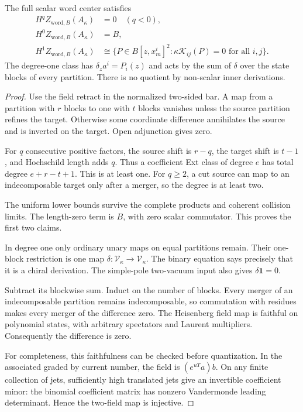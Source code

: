 \begin{theorem}\label{v4-arith:centers:thm:heis-one}
The full scalar word center satisfies
\[
\begin{split}
 H^qZ_{\mathrm{word},B}(A_\kappa)&=0\quad(q<0),\\
 H^0Z_{\mathrm{word},B}(A_\kappa)&=B,\\
 H^1Z_{\mathrm{word},B}(A_\kappa)
 &\cong
 \{P\in B[z,x^i_m]^2:
           \kappa\mathcal K_{ij}(P)=0\text{ for all }i,j\}.
\end{split}
\]
The degree-one class has
$\delta_z a^i=P_i(z)$ and acts by
the sum of $\delta$ over the state
blocks of every partition. There
is no quotient by non-scalar
inner derivations.
\end{theorem}

\begin{proof}
Use the field retract in the
normalized two-sided bar. A map
from a partition with $r$ blocks
to one with $t$ blocks vanishes
unless the source partition
refines the target. Otherwise
some coordinate difference
annihilates the source and is
inverted on the target. Open
adjunction gives zero.

For $q$ consecutive positive
factors, the source shift is
$r-q$, the target shift is
$t-1$, and Hochschild length
adds $q$. Thus a coefficient
Ext class of degree $e$ has
total degree
$e+r-t+1$. This is at least
one. For $q\geq2$, a cut source
can map to an indecomposable
target only after a merger,
so the degree is at least two.

The uniform lower bounds
survive the complete products
and coherent collision limits.
The length-zero term is $B$,
with zero scalar commutator.
This proves the first two
claims.

In degree one only ordinary
unary maps on equal partitions
remain. Their one-block
restriction is one map
$\delta:\mathscr V_\kappa\to
\mathscr V_\kappa$. The binary
equation says precisely that
it is a chiral derivation.
The simple-pole two-vacuum
input also gives
$\delta\mathbf1=0$.

Subtract its blockwise sum.
Induct on the number of
blocks. Every merger of an
indecomposable partition
remains indecomposable, so
commutation with residues
makes every merger of the
difference zero. The
Heisenberg field map is
faithful on polynomial
states, with arbitrary
spectators and Laurent
multipliers. Consequently
the difference is zero.

For completeness, this
faithfulness can be checked
before quantization. In the
associated graded by current
number, the field is
$(e^{uT}a)b$. On any finite
collection of jets, sufficiently
high translated jets give an
invertible coefficient minor:
the binomial coefficient
matrix has nonzero Vandermonde
leading determinant. Hence the
two-field map is injective.


\end{proof}
